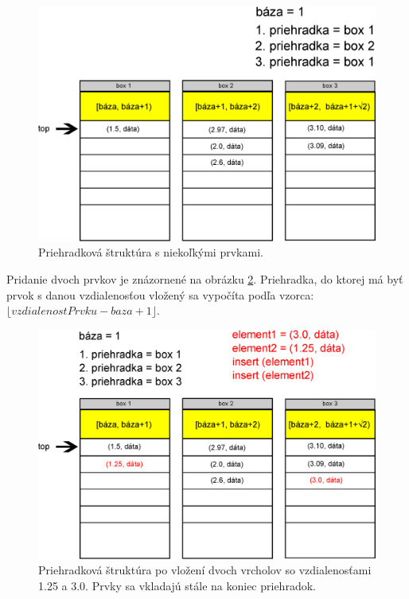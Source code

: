 \begin{figure}[h]
\centering
\includegraphics[width=\textwidth]{./img/priehradky_naplnene_default.eps}
\caption{Priehradková štruktúra s niekoľkými prvkami.}
\label{fig:priehradky}
\end{figure}

Pridanie dvoch prvkov je znázornené na obrázku \ref{fig:priehradky_i}. Priehradka, do ktorej má byť prvok s danou vzdialenosťou vložený sa vypočíta podľa vzorca: $ \lfloor vzdialenostPrvku - baza +1 \rfloor $.


\begin{figure}[h]
\centering
\includegraphics[width=\textwidth]{./img/priehradky_naplnene_default_i.eps}
\caption{Priehradková štruktúra po vložení dvoch vrcholov so vzdialenosťami 1.25 a 3.0. Prvky sa vkladajú stále na koniec priehradok.}
\label{fig:priehradky_i}
\end{figure}


